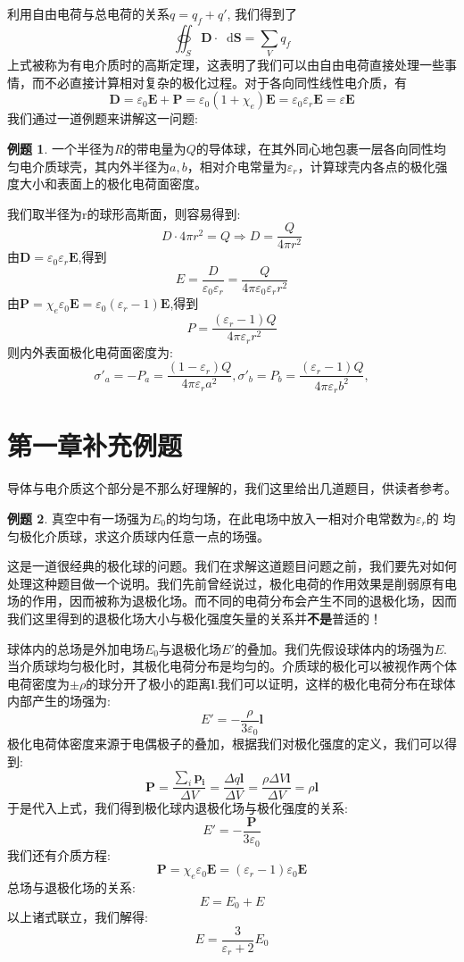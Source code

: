 \documentclass[12pt,a4paper,oneside]{report}
\theoremstyle{definition}
\newtheorem{example}{例题}[chapter]
\theoremstyle{remark}
\renewcommand{\d}{\mathop{}\!\mathrm{d}}
\begin{document}
利用自由电荷与总电荷的关系$q = q_f + q' $, 我们得到了
\[
\oiint_S \mathbf{D} \cdot \d \mathbf{S}  = \sum_V q_f
\]
上式被称为有电介质时的高斯定理，这表明了我们可以由自由电荷直接处理一些事情，而不必直接计算相对复杂的极化过程。对于各向同性线性电介质，有
\[
\mathbf{D} = \varepsilon_0 \mathbf{E}+\mathbf{P} = \varepsilon_0 (1+\chi_e)\mathbf{E} = \varepsilon_0\varepsilon_r\mathbf{E}=\varepsilon \mathbf{E}
\]
我们通过一道例题来讲解这一问题:
\begin{example}
  一个半径为$R$的带电量为$Q$的导体球，在其外同心地包裹一层各向同性均匀电介质球壳，其内外半径为$a,b$，相对介电常量为$\varepsilon_r$，计算球壳内各点的极化强度大小和表面上的极化电荷面密度。

  我们取半径为r的球形高斯面，则容易得到:
  \[
  D\cdot4\pi r^2 = Q \Rightarrow D=\frac{Q}{4\pi r^2}
  \]
  由$\mathbf{D} = \varepsilon_0\varepsilon_r\mathbf{E}$,得到
  \[
  E=\frac{D}{\varepsilon_0\varepsilon_r}=\frac{Q}{4\pi \varepsilon_0\varepsilon_r r^2}
  \]
  由$\mathbf{P}=\chi_e \varepsilon_0 \mathbf{E} = \varepsilon_0(\varepsilon_r-1)\mathbf{E}$,得到
  \[
  P=\frac{(\varepsilon_r-1)Q}{4\pi \varepsilon_r r^2}
  \]
  则内外表面极化电荷面密度为:
  \[
  \sigma'_a=-P_a = \frac{(1-\varepsilon_r)Q}{4\pi \varepsilon_r a^2},\sigma'_b=P_b = \frac{(\varepsilon_r-1)Q}{4\pi \varepsilon_rb^2},
  \]
\end{example}
\section{第一章补充例题}
导体与电介质这个部分是不那么好理解的，我们这里给出几道题目，供读者参考。
\begin{example}
真空中有一场强为$E_0$的均匀场，在此电场中放入一相对介电常数为$\varepsilon_r$的
均匀极化介质球，求这介质球内任意一点的场强。

这是一道很经典的极化球的问题。我们在求解这道题目问题之前，我们要先对如何处理这种题目做一个说明。我们先前曾经说过，极化电荷的作用效果是削弱原有电场的作用，因而被称为退极化场。而不同的电荷分布会产生不同的退极化场，因而我们这里得到的退极化场大小与极化强度矢量的关系并\textbf{不是}普适的！

球体内的总场是外加电场$E_0$与退极化场$E'$的叠加。我们先假设球体内的场强为$E$.当介质球均匀极化时，其极化电荷分布是均匀的。介质球的极化可以被视作两个体电荷密度为$\pm\rho$的球分开了极小的距离$\mathbf{l}$.我们可以证明，这样的极化电荷分布在球体内部产生的场强为:
\[
E'=-\frac{\rho}{3\varepsilon_0}\mathbf{l}
\]
极化电荷体密度来源于电偶极子的叠加，根据我们对极化强度的定义，我们可以得到:
\[
\mathbf{P}=\frac{\sum_i \mathbf{p_i}}{\Delta V}=\frac{\Delta q \mathbf{l}}{\Delta V}=\frac{\rho \Delta V \mathbf{l}}{\Delta V}=\rho \mathbf{l}
\]
于是代入上式，我们得到极化球内退极化场与极化强度的关系:
\[
E'=-\frac{\mathbf{P}}{3\varepsilon_0}
\]
我们还有介质方程:
\[
\mathbf{P}= \chi_e \varepsilon_0 \mathbf{E}= (\varepsilon_r-1)\varepsilon_0 \mathbf{E}
\]
总场与退极化场的关系:
\[
E=E_0+E
\]
以上诸式联立，我们解得:
\[
E=\frac{3}{\varepsilon_r+2}E_0
\]
\end{example}
\end{document}
